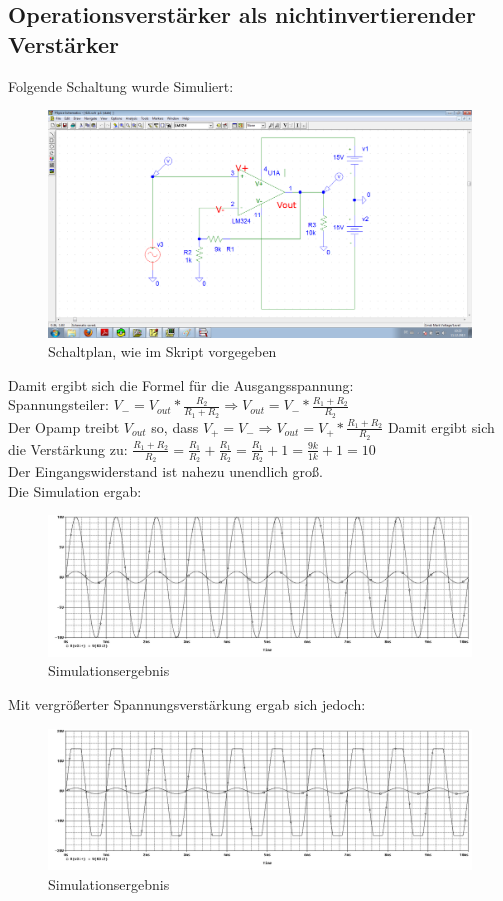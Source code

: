 \subsection{Operationsverstärker als nichtinvertierender Verstärker}
Folgende Schaltung wurde Simuliert:
\begin{figure}[H]
	\centering
	\includegraphics[width=\linewidth]{versuch6/spice/schem621.png}
	\caption{Schaltplan, wie im Skript vorgegeben}
\end{figure}
Damit ergibt sich die Formel für die Ausgangsspannung:\\
Spannungsteiler: $ V_- = V_{out} * \frac{R_2}{R_1+R_2} \Rightarrow V_{out} = V_- * \frac{R_1+R_2}{R_2} $\\
Der Opamp treibt $ V_{out} $ so, dass $ V_+ = V_- \Rightarrow V_{out} = V_+ * \frac{R_1+R_2}{R_2} $ Damit ergibt sich die Verstärkung zu: $ \frac{R_1+R_2}{R_2} = \frac{R_1}{R_2} + \frac{R_1}{R_2} = \frac{R_1}{R_2} +1 = \frac{9k}{1k}+1=10$\\
Der Eingangswiderstand ist nahezu unendlich groß.\\
Die Simulation ergab:
\begin{figure}[H]
	\centering
	\includegraphics[width=\linewidth]{versuch6/spice/621.png}
	\caption{Simulationsergebnis}
\end{figure}
Mit vergrößerter Spannungsverstärkung ergab sich jedoch:
\begin{figure}[H]
	\centering
	\includegraphics[width=\linewidth]{versuch6/spice/622.png}
	\caption{Simulationsergebnis}
\end{figure}
